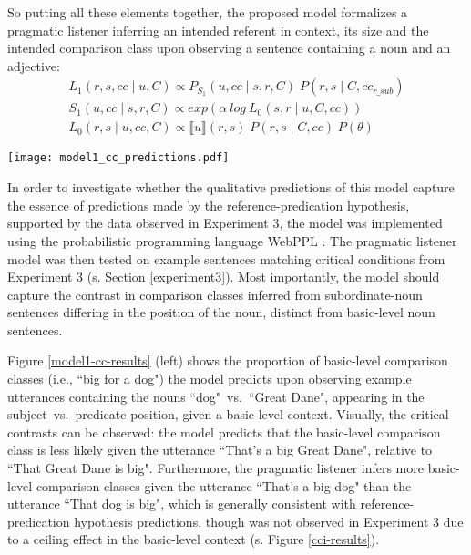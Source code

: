 So putting all these elements together, the proposed model formalizes a pragmatic listener inferring an intended referent in context, its size and the intended comparison class upon observing a sentence containing a noun and an adjective:
\begin{gather*}
	L_1 (r, s, cc \mid u, C) \propto P_{S_1} (u, cc \mid s, r, C) \; P(r, s \mid C, cc_{r\_sub}) \\
	S_1 (u, cc \mid s, r, C)  \propto exp(\alpha \: log \: L_0 (s, r \mid u, C, cc) ) \\
	L_0 (r, s \mid u, cc, C) \propto \llbracket u \rrbracket (r, s) \; P(r, s \mid C, cc) \; P(\theta)
\end{gather*}
 
\begin{figure*}[t]
 	\begin{center}
 		\texttt{[image: model1\_cc\_predictions.pdf]}%
 	\end{center}
 	\vspace{-0.3cm}
 	\caption{Qualitative predictions made by the Refpred-RSA model: Pragmatic listener inferences are plotted in terms of the probability to use the basic-level comparison class (i.e., ``big for a dog"), given utterances differing in the noun and its position, presented in a basic-level context (left)~vs.~subordinate context (right). Qualitatively, the crucial noun$\times$syntax interaction can be observed. Note the different y-axis scaling.}
 	\label{model1-cc-results}
 \end{figure*}
In order to investigate whether the qualitative predictions of this model capture the essence of predictions made by the reference-predication hypothesis, supported by the data observed in Experiment 3, the model was implemented using the probabilistic programming language WebPPL \parencite{dippl}. The pragmatic listener model was then tested on example sentences matching critical conditions from Experiment 3 (s. Section \ref{experiment3}). Most importantly, the model should capture the contrast in comparison classes inferred from subordinate-noun sentences differing in the position of the noun, distinct from basic-level noun sentences.

Figure \ref{model1-cc-results} (left) shows the proportion of basic-level comparison classes (i.e., ``big for a dog") the model predicts upon observing example utterances containing the nouns ``dog"~vs.~``Great Dane", appearing in the subject~vs.~predicate position, given a basic-level context. 
Visually, the critical contrasts can be observed: the model predicts that the basic-level comparison class is less likely given the utterance ``That's a big Great Dane", relative to ``That Great Dane is big". %
Furthermore, the pragmatic listener infers more basic-level comparison classes given the utterance ``That's a big dog" than the utterance ``That dog is big", which is generally consistent with reference-predication hypothesis predictions, though was not observed in Experiment 3 due to a ceiling effect in the basic-level context (s. Figure \ref{cci-results}). 

